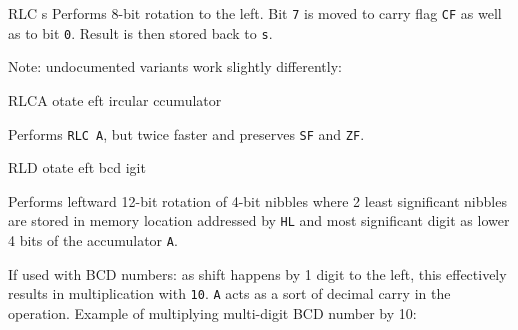 \documentclass[12pt,twoside,openright,a4paper]{book}
\begin{document}
\begin{basedescript}{
	\desclabelstyle{\multilinelabel}
	\desclabelwidth{3cm}}
\begin{DetailItem}{RLC s}
		Performs 8-bit rotation to the left. Bit {\tt 7} is moved to carry flag {\tt CF} as well as to bit {\tt 0}. Result is then stored back to {\tt s}.

		Note: undocumented variants work slightly differently:

		\begin{multicols}{2}

		\end{multicols}

		\begin{DetailEffects}[p]
			\FlagsRLCr
		\end{DetailEffects}
						
		\begin{DetailTiming}
		\end{DetailTiming}

	\end{DetailItem}

	\pagebreak
	\begin{DetailItem}{RLCA}
		{otate eft ircular ccumulator}
		{\SymRLC{A}}
		
		Performs {\tt RLC A}, but twice faster and preserves {\tt SF} and {\tt ZF}.

		\begin{DetailEffects}
			\FlagsRLCA
		\end{DetailEffects}
						
		\begin{DetailTiming}
			\DetailTime{1}{4}
		\end{DetailTiming}

	\end{DetailItem}

	\label{DetailRefRLD}
	\begin{DetailItem}{RLD}
		{otate eft bcd igit}
		{\SymRLD}

		Performs leftward 12-bit rotation of 4-bit nibbles where 2 least significant nibbles are stored in memory location addressed by {\tt HL} and most significant digit as lower 4 bits of the accumulator {\tt A}.
		
		If used with BCD numbers: as shift happens by 1 digit to the left, this effectively results in multiplication with {\tt 10}. {\tt A} acts as a sort of decimal carry in the operation. Example of multiplying multi-digit BCD number by 10:


\end{DetailItem}
\end{basedescript}
\end{document}
